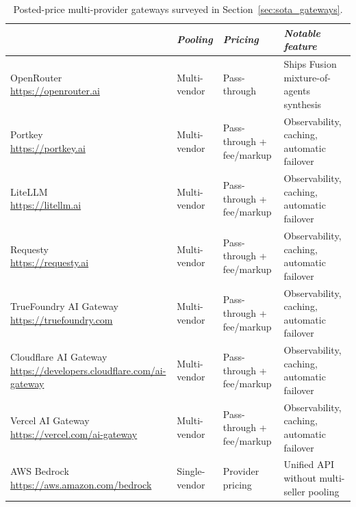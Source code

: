 \begin{samepage}
  \begin{table}[H]
    \centering
    \footnotesize
    \begin{tabular}{l|l|l|p{4.4cm}|}
                                                    & \emph{Pooling} & \emph{Pricing} & \emph{Notable feature} \\
      \hline
      \makecell[l]{OpenRouter \\ {\scriptsize\url{https://openrouter.ai}}}
        & Multi-vendor & Pass-through & Ships Fusion mixture-of-agents synthesis \\
      \hline
      \makecell[l]{Portkey \\ {\scriptsize\url{https://portkey.ai}}}
        & Multi-vendor & Pass-through + fee/markup & Observability, caching, automatic failover \\
      \hline
      \makecell[l]{LiteLLM \\ {\scriptsize\url{https://litellm.ai}}}
        & Multi-vendor & Pass-through + fee/markup & Observability, caching, automatic failover \\
      \hline
      \makecell[l]{Requesty \\ {\scriptsize\url{https://requesty.ai}}}
        & Multi-vendor & Pass-through + fee/markup & Observability, caching, automatic failover \\
      \hline
      \makecell[l]{TrueFoundry AI Gateway \\ {\scriptsize\url{https://truefoundry.com}}}
        & Multi-vendor & Pass-through + fee/markup & Observability, caching, automatic failover \\
      \hline
      \makecell[l]{Cloudflare AI Gateway \\ {\scriptsize\url{https://developers.cloudflare.com/ai-gateway}}}
        & Multi-vendor & Pass-through + fee/markup & Observability, caching, automatic failover \\
      \hline
      \makecell[l]{Vercel AI Gateway \\ {\scriptsize\url{https://vercel.com/ai-gateway}}}
        & Multi-vendor & Pass-through + fee/markup & Observability, caching, automatic failover \\
      \hline
      \makecell[l]{AWS Bedrock \\ {\scriptsize\url{https://aws.amazon.com/bedrock}}}
        & Single-vendor & Provider pricing & Unified API without multi-seller pooling \\
      \hline
    \end{tabular}
    \caption{Posted-price multi-provider gateways surveyed in
      Section~\ref{sec:sota_gateways}.}
    \label{tab:sota_gateways_companies}
  \end{table}
\end{samepage}

